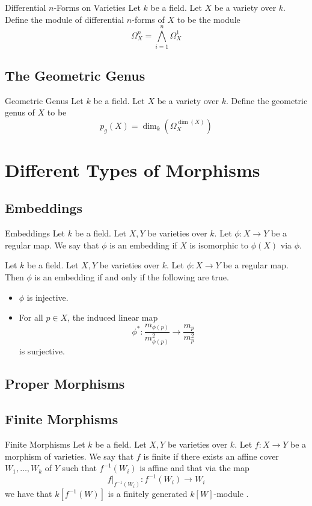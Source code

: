 \documentclass[a4paper]{article}
\begin{document}
\begin{defn}{Differential $n$-Forms on Varieties}{} Let $k$ be a field. Let $X$ be a variety over $k$. Define the module of differential $n$-forms of $X$ to be the module $$\Omega_X^n=\bigwedge_{i=1}^n\Omega_X^1$$
\end{defn}

\subsection{The Geometric Genus}
\begin{defn}{Geometric Genus}{} Let $k$ be a field. Let $X$ be a variety over $k$. Define the geometric genus of $X$ to be $$p_g(X)=\dim_k\left(\Omega_X^{\dim(X)}\right)$$
\end{defn}

\pagebreak
\section{Different Types of Morphisms}
\subsection{Embeddings}
\begin{defn}{Embeddings}{} Let $k$ be a field. Let $X,Y$ be varieties over $k$. Let $\phi:X\to Y$ be a regular map. We say that $\phi$ is an embedding if $X$ is isomorphic to $\phi(X)$ via $\phi$. 
\end{defn}

\begin{prp}{}{} Let $k$ be a field. Let $X,Y$ be varieties over $k$. Let $\phi:X\to Y$ be a regular map. Then $\phi$ is an embedding if and only if the following are true. 
\begin{itemize}
\item $\phi$ is injective. 
\item For all $p\in X$, the induced linear map $$\phi^\ast:\frac{m_{\phi(p)}}{m_{\phi(p)}^2}\to\frac{m_p}{m_p^2}$$ is surjective. 
\end{itemize}
\end{prp}

\subsection{Proper Morphisms}

\subsection{Finite Morphisms}
\begin{defn}{Finite Morphisms}{} Let $k$ be a field. Let $X,Y$ be varieties over $k$. Let $f:X\to Y$ be a morphism of varieties. We say that $f$ is finite if there exists an affine cover $W_1,\dots,W_k$ of $Y$ such that $f^{-1}(W_i)$ is affine and that via the map $$f|_{f^{-1}(W_i)}:f^{-1}(W_i)\to W_i$$ we have that $k[f^{-1}(W)]$ is a finitely generated $k[W]$-module . 
\end{defn}
\end{document}
